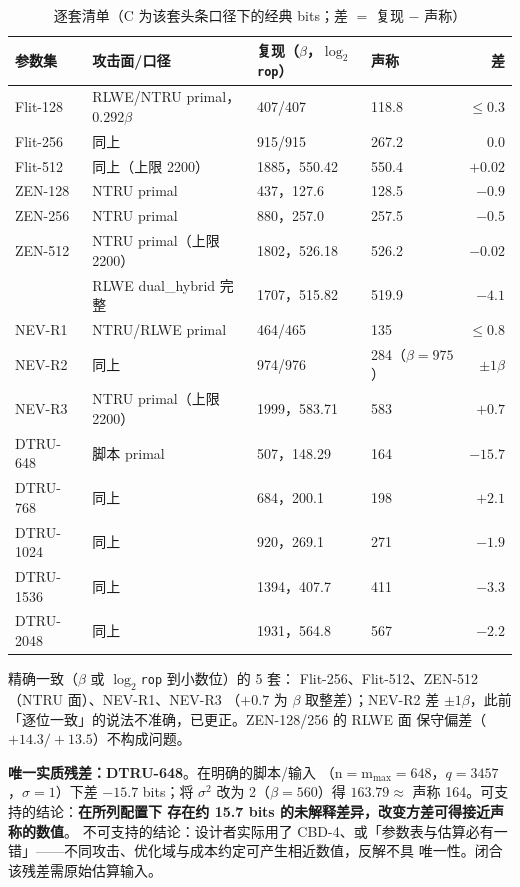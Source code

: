 \documentclass[11pt,a4paper,zihao=-4]{ctexart}
\newcommand{\code}[1]{\texttt{#1}}
\begin{document}
\begin{table}[htbp]\centering\small
\caption{逐套清单（C 为该套头条口径下的经典 bits；差 $=$ 复现 $-$ 声称）}\label{tab:inv}
\begin{tabular}{@{}llllr@{}}
\toprule
参数集 & 攻击面/口径 & 复现（$\beta$，$\log_2$\code{rop}） & 声称 & 差 \\
\midrule
Flit-128 & RLWE/NTRU primal，$0.292\beta$ & 407/407 & 118.8 & $\le 0.3$ \\
Flit-256 & 同上 & 915/915 & 267.2 & $0.0$ \\
Flit-512 & 同上（上限 2200） & 1885，550.42 & 550.4 & $+0.02$ \\
ZEN-128 & NTRU primal & 437，127.6 & 128.5 & $-0.9$ \\
ZEN-256 & NTRU primal & 880，257.0 & 257.5 & $-0.5$ \\
ZEN-512 & NTRU primal（上限 2200） & 1802，526.18 & 526.2 & $-0.02$ \\
 & RLWE dual\_hybrid 完整 & 1707，515.82 & 519.9 & $-4.1$ \\
NEV-R1 & NTRU/RLWE primal & 464/465 & 135 & $\le 0.8$ \\
NEV-R2 & 同上 & 974/976 & 284（$\beta{=}975$） & $\pm 1\beta$ \\
NEV-R3 & NTRU primal（上限 2200） & 1999，583.71 & 583 & $+0.7$ \\
DTRU-648 & 脚本 primal & 507，148.29 & 164 & $\mathbf{-15.7}$ \\
DTRU-768 & 同上 & 684，200.1 & 198 & $+2.1$ \\
DTRU-1024 & 同上 & 920，269.1 & 271 & $-1.9$ \\
DTRU-1536 & 同上 & 1394，407.7 & 411 & $-3.3$ \\
DTRU-2048 & 同上 & 1931，564.8 & 567 & $-2.2$ \\
\bottomrule
\end{tabular}
\end{table}

精确一致（$\beta$ 或 $\log_2$\code{rop} 到小数位）的 5 套：
Flit-256、Flit-512、ZEN-512（NTRU 面）、NEV-R1、NEV-R3
（$+0.7$ 为 $\beta$ 取整差）；NEV-R2 差 $\pm 1\beta$，此前
「逐位一致」的说法不准确，已更正。ZEN-128/256 的 RLWE 面
保守偏差（$+14.3/+13.5$）不构成问题。

\textbf{唯一实质残差：DTRU-648}。在明确的脚本/输入
（n$=$m$_{\max}{=}648$，$q{=}3457$，$\sigma{=}1$）下差
$-15.7$ bits；将 $\sigma^2$ 改为 2（$\beta{=}560$）得
$163.79\approx$ 声称 164。可支持的结论：\textbf{在所列配置下
存在约 15.7 bits 的未解释差异，改变方差可得接近声称的数值}。
不可支持的结论：设计者实际用了 CBD-4、或「参数表与估算必有一
错」——不同攻击、优化域与成本约定可产生相近数值，反解不具
唯一性。闭合该残差需原始估算输入。
\end{document}
